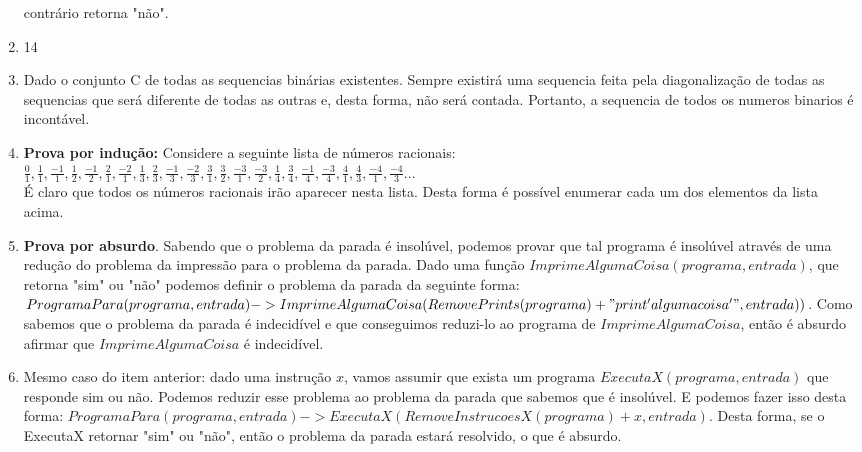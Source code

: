 \documentclass[11pt]{article}
\begin{document}
\begin{enumerate}
    contrário retorna "não".
    \item 14
    \item Dado o conjunto C de todas as sequencias binárias existentes. Sempre
        existirá uma sequencia feita pela diagonalização de todas as sequencias
        que será diferente de todas as outras e, desta forma, não será contada.
        Portanto, a sequencia de todos os numeros binarios é incontável.
    \item \textbf{Prova por indução:} Considere a seguinte lista de números racionais: \\
        $\displaystyle \frac 0 1, \frac 1 1, \frac {-1} 1, \frac 1 2, \frac {-1} 2, \frac 2 1, \frac {-2} 1, \frac 1 3, \frac 2 3, \frac {-1} 3, \frac {-2} 3, \frac 3 1, \frac 3 2, \frac {-3} 1, \frac {-3} 2, \frac 1 4, \frac 3 4, \frac {-1} 4, \frac {-3} 4, \frac 4 1, \frac 4 3, \frac {-4} 1, \frac {-4} 3 \ldots$ \\
        É claro que todos os números racionais irão aparecer nesta lista. Desta
        forma é possível enumerar cada um dos elementos da lista acima.
    \item \textbf{Prova por absurdo}. Sabendo que o problema da parada é
        insolúvel, podemos provar que tal programa é insolúvel através de uma
        redução do problema da impressão para o problema da parada. Dado uma
        função $ImprimeAlgumaCoisa(programa, entrada)$, que retorna "sim" ou
        "não" podemos definir o problema da parada da seguinte forma:
        $ProgramaPara(programa, entrada) ->
        ImprimeAlgumaCoisa(RemovePrints(programa) + "print 'alguma coisa'", entrada))$.
        Como sabemos que o problema da parada é indecidível e que conseguimos
        reduzi-lo ao programa de $ImprimeAlgumaCoisa$, então é absurdo afirmar
        que $ImprimeAlgumaCoisa$ é indecidível.
    \item Mesmo caso do item anterior: dado uma instrução $x$, vamos assumir
        que exista um programa $ExecutaX(programa, entrada)$ que responde sim
        ou não. Podemos reduzir esse problema ao problema da parada que sabemos
        que é insolúvel. E podemos fazer isso desta forma:
        $ProgramaPara(programa, entrada) -> ExecutaX(RemoveInstrucoesX(programa)+x, entrada)$.
        Desta forma, se o ExecutaX retornar "sim" ou "não", então o problema da
        parada estará resolvido, o que é absurdo.
\end{enumerate}

\end{document}
